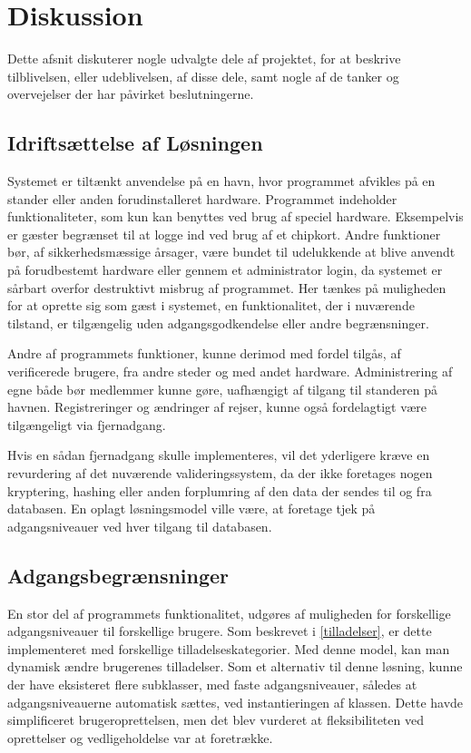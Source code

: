 \chapter{Diskussion}
\label{cha:diskussion}

Dette afsnit diskuterer nogle udvalgte dele af projektet, for at beskrive tilblivelsen, eller udeblivelsen, af disse dele, samt nogle af de tanker og overvejelser der har påvirket beslutningerne.

\section{Idriftsættelse af Løsningen} 


Systemet er tiltænkt anvendelse på en havn, hvor programmet afvikles på en stander eller anden forudinstalleret hardware. Programmet indeholder funktionaliteter, som kun kan benyttes ved brug af speciel hardware. Eksempelvis er gæster begrænset til at logge ind ved brug af et chipkort. Andre funktioner bør, af sikkerhedsmæssige årsager, være bundet til udelukkende at blive anvendt på forudbestemt hardware eller gennem et administrator login, da systemet er sårbart overfor destruktivt misbrug af programmet. Her tænkes på muligheden for at oprette sig som gæst i systemet, en funktionalitet, der i nuværende tilstand, er tilgængelig uden adgangsgodkendelse eller andre begrænsninger.

Andre af programmets funktioner, kunne derimod med fordel tilgås, af verificerede brugere, fra andre steder og med andet hardware. Administrering af egne både bør medlemmer kunne gøre, uafhængigt af tilgang til standeren på havnen. Registreringer og ændringer af rejser, kunne også fordelagtigt være tilgængeligt via fjernadgang.

Hvis en sådan fjernadgang skulle implementeres, vil det yderligere kræve en revurdering af det nuværende valideringssystem, da der ikke foretages nogen kryptering, hashing eller anden forplumring af den data der sendes til og fra databasen. En oplagt løsningsmodel ville være, at foretage tjek på adgangsniveauer ved hver tilgang til databasen.

\section{Adgangsbegrænsninger}

En stor del af programmets funktionalitet, udgøres af muligheden for forskellige adgangsniveauer til forskellige brugere. Som beskrevet i \cref{tilladelser}, er dette implementeret med forskellige tilladelseskategorier. Med denne model, kan man dynamisk ændre brugerenes tilladelser. Som et alternativ til denne løsning, kunne der have eksisteret flere subklasser, med faste adgangsniveauer, således at adgangsniveauerne automatisk sættes, ved instantieringen af klassen. Dette havde simplificeret brugeroprettelsen, men det blev vurderet at fleksibiliteten ved oprettelser og vedligeholdelse var at foretrække. 

